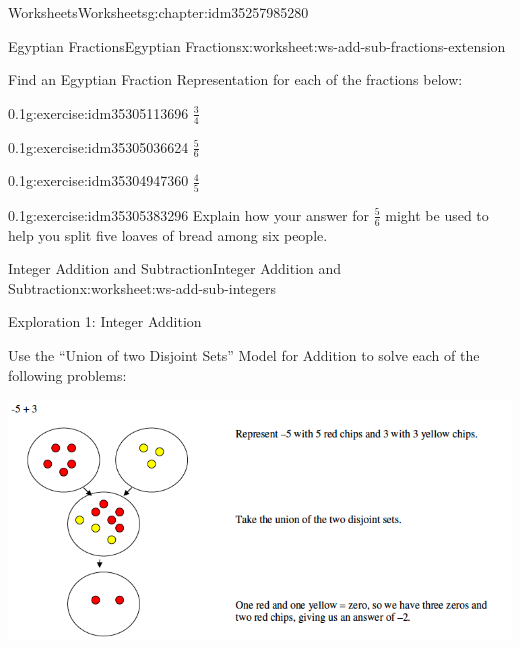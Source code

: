 \documentclass[twoside,11pt,]{book}
\begin{document}
\begin{chapterptx}{Worksheets}{}{Worksheets}{}{}{g:chapter:idm35257985280}
\begin{worksheet-section-numberless}{Egyptian Fractions}{}{Egyptian Fractions}{}{}{x:worksheet:ws-add-sub-fractions-extension}
\begin{introduction}{}
Find an Egyptian Fraction Representation for each of the fractions below:%
\end{introduction}%
\begin{divisionexercise}{1}{}{0.1}{g:exercise:idm35305113696}%
\(\frac{3}{4} \)%
\end{divisionexercise}%
\begin{divisionexercise}{2}{}{0.1}{g:exercise:idm35305036624}%
\(\frac{5}{6} \)%
\end{divisionexercise}%
\begin{divisionexercise}{3}{}{0.1}{g:exercise:idm35304947360}%
\(\frac{4}{5} \)%
\end{divisionexercise}%
\begin{divisionexercise}{4}{}{0.1}{g:exercise:idm35305383296}%
Explain how your answer for \(\frac{5}{6} \) might be used to help you split five loaves of bread among six people.%
\end{divisionexercise}%
\end{worksheet-section-numberless}
\restoregeometry
%
%
\typeout{************************************************}
\typeout{************************************************}
%
\begin{worksheet-section-numberless}{Integer Addition and Subtraction}{}{Integer Addition and Subtraction}{}{}{x:worksheet:ws-add-sub-integers}
\begin{introduction}{}%
Exploration 1: Integer Addition%
\par
Use the ``Union of two Disjoint Sets'' Model for Addition to solve each of the following problems: \begin{sidebyside}{1}{0}{0}{0}%
\begin{sbspanel}{1}%
\includegraphics[width=1\linewidth]{images/integer-add-model.png}
\end{sbspanel}%

\end{sidebyside}
\end{introduction}
\end{worksheet-section-numberless}
\end{chapterptx}
\end{document}
